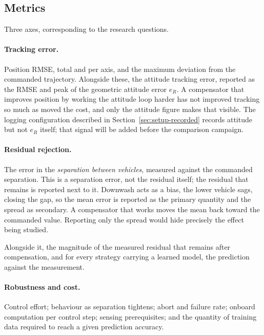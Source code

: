 \subsection{Metrics}
\label{sec:setup-metrics}

Three axes, corresponding to the research questions.

\paragraph{Tracking error.} Position RMSE, total and per axis, and the maximum deviation from the
commanded trajectory. Alongside these, the attitude tracking error, reported as the RMSE and peak
of the geometric attitude error $e_R$. A compensator that improves position by working the attitude
loop harder has not improved tracking so much as moved the cost, and only the attitude figure makes
that visible. The logging configuration described in Section~\ref{sec:setup-recorded} records
attitude but not $e_R$ itself; that signal will be added before the comparison campaign.

\paragraph{Residual rejection.} The error in the \emph{separation between vehicles}, measured
against the commanded separation. This is a separation error, not the residual itself; the residual
that remains is reported next to it. Downwash acts as a bias, the lower vehicle sags, closing the
gap, so the mean error is reported as the primary quantity and the spread as secondary. A
compensator that works moves the mean back toward the commanded value. Reporting only the spread
would hide precisely the effect being studied.

Alongside it, the magnitude of the measured residual that remains after compensation, and for every
strategy carrying a learned model, the prediction against the measurement.

\paragraph{Robustness and cost.} Control effort; behaviour as separation tightens; abort and
failure rate; onboard computation per control step; sensing prerequisites; and the quantity of
training data required to reach a given prediction accuracy.

